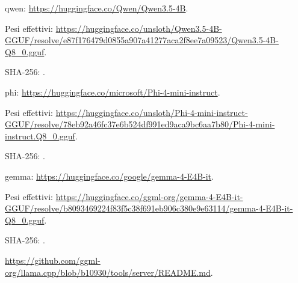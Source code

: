 qwen: \url{https://huggingface.co/Qwen/Qwen3.5-4B}.

Pesi effettivi: \url{https://huggingface.co/unsloth/Qwen3.5-4B-GGUF/resolve/e87f176479d0855a907a41277aca2f8ee7a09523/Qwen3.5-4B-Q8_0.gguf}.

SHA-256: \texttt{}.

phi: \url{https://huggingface.co/microsoft/Phi-4-mini-instruct}.

Pesi effettivi: \url{https://huggingface.co/unsloth/Phi-4-mini-instruct-GGUF/resolve/78eb92a46fc37e6b524df991ed9aca9bc6aa7b80/Phi-4-mini-instruct.Q8_0.gguf}.

SHA-256: \texttt{}.

gemma: \url{https://huggingface.co/google/gemma-4-E4B-it}.

Pesi effettivi: \url{https://huggingface.co/ggml-org/gemma-4-E4B-it-GGUF/resolve/b8093469224f83f5c38f691eb906c380e9e63114/gemma-4-E4B-it-Q8_0.gguf}.

SHA-256: \texttt{}.

\url{https://github.com/ggml-org/llama.cpp/blob/b10930/tools/server/README.md}.
